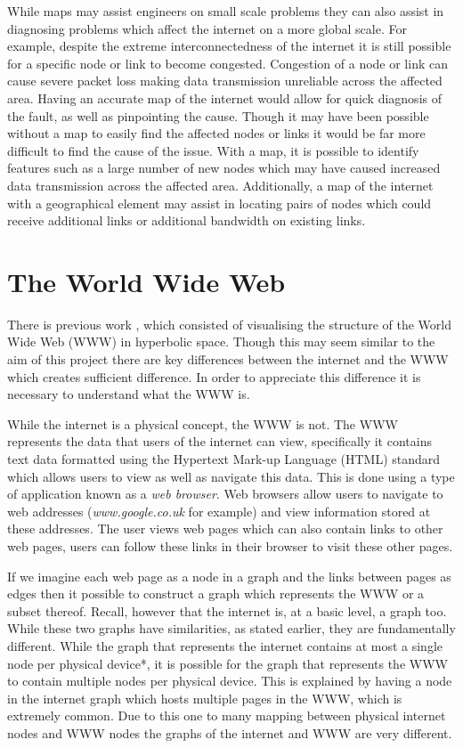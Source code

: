 While maps may assist engineers on small scale problems they can also assist in diagnosing problems which affect the internet on a more global scale. For example, despite the extreme interconnectedness of the internet it is still possible for a specific node or link to become congested. Congestion of a node or link can cause severe packet loss making data transmission unreliable across the affected area. Having an accurate map of the internet would allow for quick diagnosis of the fault, as well as pinpointing the cause. Though it may have been possible without a map to easily find the affected nodes or links it would be far more difficult to find the cause of the issue. With a map, it is possible to identify features such as a large number of new nodes which may have caused increased data transmission across the affected area. Additionally, a map of the internet with a geographical element may assist in locating pairs of nodes which could receive additional links or additional bandwidth on existing links.

\section{The World Wide Web}
\label{sec:LitReviewWWW}
There is previous work \cite{munzner_visualizing_1995}, which consisted of visualising the structure of the World Wide Web (WWW) in hyperbolic space. Though this may seem similar to the aim of this project there are key differences between the internet and the WWW which creates sufficient difference. In order to appreciate this difference it is necessary to understand what the WWW is. 

While the internet is a physical concept, the WWW is not. The WWW represents the data that users of the internet can view, specifically it contains text data formatted using the Hypertext Mark-up Language (HTML) standard which allows users to view as well as navigate this data. This is done using a type of application known as a \textit{web browser}. Web browsers allow users to navigate to web addresses (\textit{www.google.co.uk} for example) and view information stored at these addresses. The user views web pages which can also contain links to other web pages, users can follow these links in their browser to visit these other pages. 

If we imagine each web page as a node in a graph and the links between pages as edges then it possible to construct a graph which represents the WWW or a subset thereof. Recall, however that the internet is, at a basic level, a graph too. While these two graphs have similarities, as stated earlier, they are fundamentally different. While the graph that represents the internet contains at most a single node per physical device*, it is possible for the graph that represents the WWW to contain multiple nodes per physical device. This is explained by having a node in the internet graph which hosts multiple pages in the WWW, which is extremely common. Due to this one to many mapping between physical internet nodes and WWW nodes the graphs of the internet and WWW are very different. 

